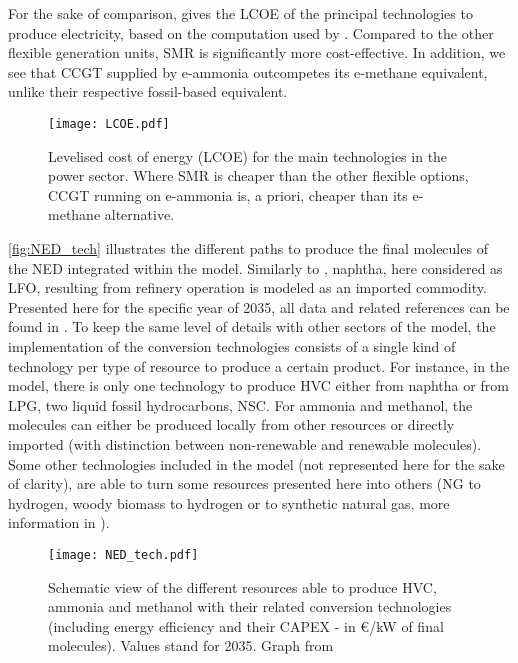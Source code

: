 For the sake of comparison,  gives the \gls{LCOE} of the principal technologies to produce electricity, based on the computation used by \citet{limpens2021generating}. Compared to the other flexible generation units, \gls{SMR} is significantly more cost-effective. In addition, we see that \gls{CCGT} supplied by e-ammonia outcompetes its e-methane equivalent, unlike their respective fossil-based equivalent.

\begin{figure}[htbp!]
\centering
\texttt{[image: LCOE.pdf]}
\caption{Levelised cost of energy (LCOE) for the main technologies in the power sector. Where \gls{SMR} is cheaper than the other flexible options, CCGT running on e-ammonia is, a priori, cheaper than its e-methane alternative.}
\label{fig:LCOE}
\end{figure}

\autoref{fig:NED_tech} illustrates the different paths to produce the final molecules of the NED integrated within the model. Similarly to \cite{tsiropoulos2018emerging}, naphtha, here considered as \gls{LFO}, resulting from refinery operation is modeled as an imported commodity. Presented here for the specific year of 2035, all data and related references can be found in \cite{GIT_NED}. To keep the same level of details with other sectors of the model, the implementation of the conversion technologies consists of a single kind of technology per type of resource to produce a certain product. For instance, in the model, there is only one technology to produce \gls{HVC} either from naphtha or from LPG, two liquid fossil hydrocarbons, \ie \gls{NSC}. For ammonia and methanol, the molecules can either be produced locally from other resources or directly imported (with distinction between non-renewable and renewable molecules). Some other technologies included in the model (not represented here for the sake of clarity), are able to turn some resources presented here into others (\eg \gls{NG} to hydrogen, woody biomass to hydrogen or to synthetic natural gas, more information in \cite{Limpens2020}).

\begin{figure}[htbp!]
\centering
\texttt{[image: NED\_tech.pdf]}
\caption{Schematic view of the different resources able to produce \gls{HVC}, ammonia and methanol with their related conversion technologies (including energy efficiency and their CAPEX - in €/kW of final molecules).  Values stand for 2035. Graph from \cite{rixhon2021comprehensive}}
\label{fig:NED_tech}
\end{figure}

